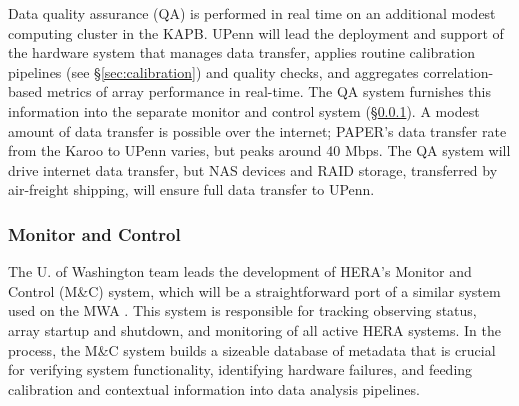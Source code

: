 \documentclass[preprint]{aastex}
\newcommand{\compress}{\vspace{-0.3in}}
\begin{document}
Data quality assurance (QA) is performed in real time on an additional modest 
computing cluster in the
KAPB.  UPenn will lead the deployment and support of the hardware system that
manages data transfer, applies routine calibration pipelines (see \S\ref{sec:calibration}) and quality
checks, and aggregates correlation-based metrics of array performance in real-time.  The QA system
furnishes this information into the separate monitor and control system (\S\ref{sec:monitor}).
A modest amount of data transfer is possible over the internet; PAPER's data transfer rate from the Karoo
to UPenn varies, but peaks around 40 Mbps.  The QA system will drive internet data transfer, but
NAS devices and RAID storage, transferred by air-freight shipping, will ensure full data transfer to UPenn.




\compress
\subsubsection{Monitor and Control}
\label{sec:monitor}

The U. of Washington team leads the development of HERA's Monitor and Control (M\&C) system,
which will be a straightforward port of a similar system used on the MWA \citep{tingay_et_al2013_trunc}.
This system is
responsible for tracking observing status, array startup and shutdown, and
monitoring of all active HERA systems. In the process, the M\&C system builds a sizeable database of 
metadata that is crucial for verifying system functionality, identifying hardware failures, and feeding
calibration and contextual information into data analysis pipelines.  
\end{document}

